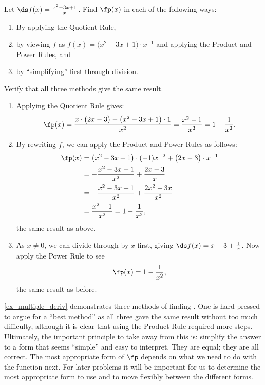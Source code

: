 \begin{example}\label{ex_multiple_deriv}
Let $\ds f(x) = \frac{x^2-3x+1}{x}$. Find $\fp(x)$ in each of the following ways:
\begin{enumerate}
	\item	By applying the Quotient Rule,
	\item	by viewing $f$ as $f(x) = \big(x^2-3x+1\big)\cdot x^{-1}$ and applying the Product and Power Rules, and
	\item	by ``simplifying\primeskip'' first through division.
\end{enumerate}
Verify that all three methods give the same result.
\solution
\begin{enumerate}
	\item	Applying the Quotient Rule gives:
	\[\fp(x) = \frac{x\cdot\big(2x-3\big)-\big(x^2-3x+1\big)\cdot 1}{x^2} = \frac{x^2-1}{x^2} = 1-\frac{1}{x^2}.\]
	\item	By rewriting $f$, we can apply the Product and Power Rules as follows:
	\begin{align*}
		\fp(x)
		&= \big(x^2-3x+1\big)\cdot (-1)x^{-2} + \big(2x-3\big)\cdot x^{-1} \\
		&= -\frac{x^2-3x+1}{x^2}+\frac{2x-3}{x} \\
		&= -\frac{x^2-3x+1}{x^2}+\frac{2x^2-3x}{x^2}\\
		&= \frac{x^2-1}{x^2} = 1-\frac{1}{x^2},
	\end{align*}
	the same result as above.
	\item	As $x\neq 0$, we can divide through by $x$ first, giving $\ds f(x) = x-3+\frac{1}x$. Now apply the Power Rule to see
	\[\fp(x) = 1-\frac{1}{x^2},\]
	the same result as before.
\end{enumerate}
\end{example}

\autoref{ex_multiple_deriv} demonstrates three methods of finding \fp. One is hard pressed to argue for a ``best method'' as all three gave the same result without too much difficulty, although it is clear that using the Product Rule required more steps. Ultimately, the important principle to take away from this is: simplify the answer to a form that seems ``simple'' and easy to interpret.  They are equal; they are all correct. The most appropriate form of $\fp$ depends on what we need to do with the function next. For later problems it will be important for us to determine the most appropriate form to use and to move flexibly between the different forms.
		
